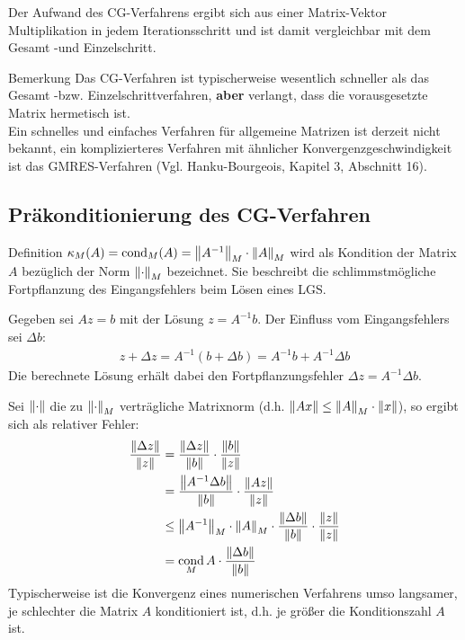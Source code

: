 Der Aufwand des CG-Verfahrens ergibt sich aus einer Matrix-Vektor Multiplikation in jedem Iterationsschritt 
und ist damit vergleichbar mit dem Gesamt -und Einzelschritt.

\begin{colbox}{Bemerkung}
  Das CG-Verfahren ist typischerweise wesentlich schneller als das Gesamt -bzw. Einzelschrittverfahren, 
  \textbf{aber} verlangt, dass die vorausgesetzte Matrix hermetisch ist. \\
  Ein schnelles und einfaches Verfahren für allgemeine Matrizen ist derzeit nicht bekannt, ein komplizierteres 
  Verfahren mit ähnlicher Konvergenzgeschwindigkeit ist das GMRES-Verfahren 
  (Vgl. Hanku-Bourgeois, Kapitel 3, Abschnitt 16). 
\end{colbox}

\subsection{Präkonditionierung des CG-Verfahren}

\begin{colbox}{Definition}
  $\kappa_M(A) = \cond_M(A) = \vertn{2}{A^{-1}}_M\cdot \vertn{2}{A}_M$ wird als Kondition der Matrix $A$ bezüglich 
  der Norm $\vertn{2}{\cdot}_M$ bezeichnet. 
  Sie beschreibt die schlimmstmögliche Fortpflanzung des Eingangsfehlers beim Lösen eines LGS.
\end{colbox}

Gegeben sei $Az=b$ mit der Lösung $z=A^{-1}b$. Der Einfluss vom Eingangsfehlers sei $\Delta b$:
%
\begin{align*}
  z + \Delta z 
  = A^{-1}(b+\Delta b) 
  = A^{-1}b + A^{-1}\Delta b
\end{align*}
Die berechnete Lösung erhält dabei den Fortpflanzungsfehler $\Delta z = A^{-1}\Delta b$. 

Sei $\vertn{2}{\cdot}$ die zu $\vertn{2}{\cdot}_M$ verträgliche Matrixnorm 
(d.h. $\vertn{2}{Ax}\leq \vertn{2}{A}_M\cdot\vertn{2}{x}$), 
so ergibt sich als relativer Fehler:
%
\begin{align*}
  \dfrac{\vertn{2}{\Delta z}}{\vertn{2}{z}} 
  &= \dfrac{\vertn{2}{\Delta z}}{\vertn{2}{b}} \cdot\dfrac{\vertn{2}{b}}{\vertn{2}{z}} \\
  &= \dfrac{\vertn{2}{A^{-1}\Delta b}}{\vertn{2}{b}} \cdot\dfrac{\vertn{2}{Az}}{\vertn{2}{z}} \\
  &\leq \vertn{2}{A^{-1}}_M \cdot \vertn{2}{A}_M \cdot \dfrac{\vertn{2}{\Delta b}}{\vertn{2}{b}} 
  \cdot \dfrac{\vertn{2}{z}}{\vertn{2}{z}} \\
  &= \cond_M{A}\cdot\dfrac{\vertn{2}{\Delta b}}{\vertn{2}{b}} \\
\end{align*}
%
Typischerweise ist die Konvergenz eines numerischen Verfahrens umso langsamer, je schlechter die Matrix $A$ 
konditioniert ist, d.h. je größer die Konditionszahl $A$ ist.

